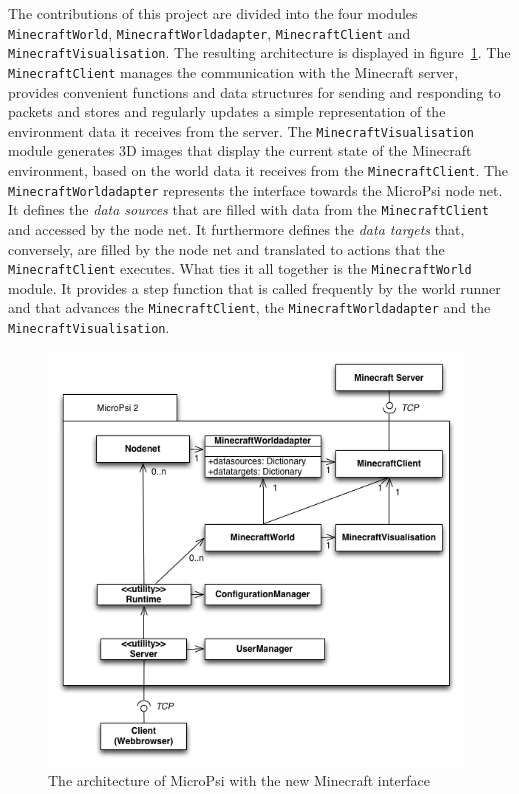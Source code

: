
The contributions of this project are divided into the four modules \texttt{MinecraftWorld}, \texttt{MinecraftWorldadapter}, \texttt{MinecraftClient} and \texttt{MinecraftVisualisation}. The resulting architecture is displayed in figure~\ref{uml_mc}. The \texttt{MinecraftClient} manages the communication with the Minecraft server, provides convenient functions and data structures for sending and responding to packets and stores and regularly updates a simple representation of the environment data it receives from the server. The \texttt{MinecraftVisualisation} module generates 3D images that display the current state of the Minecraft environment, based on the world data it receives from the \texttt{MinecraftClient}. The \texttt{MinecraftWorldadapter} represents the interface towards the MicroPsi node net. It defines the \emph{data sources} that are filled with data from the \texttt{MinecraftClient} and accessed by the node net. It furthermore defines the \emph{data targets} that, conversely, are filled by the node net and translated to actions that the \texttt{MinecraftClient} executes. What ties it all together is the \texttt{MinecraftWorld} module. It provides a step function that is called frequently by the world runner and that advances the \texttt{MinecraftClient}, the \texttt{MinecraftWorldadapter} and the \texttt{MinecraftVisualisation}.

\begin{figure}[h]
  \centering
    \includegraphics[width=11cm]{graphics/UML_MicroPsi_mit_spock_v14}
  \caption{The architecture of MicroPsi with the new Minecraft interface}
  \label{uml_mc}
\end{figure}

